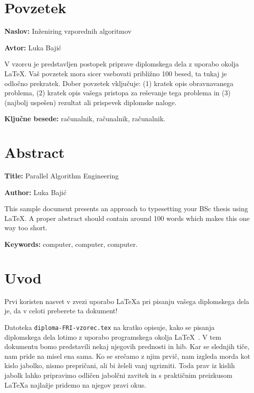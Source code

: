 \documentclass[a4paper,12pt,openright]{book}
\newcommand{\ttitle}{Inženiring vzporednih algoritmov}
\newcommand{\ttitleEn}{Parallel Algorithm Engineering}
\newcommand{\tauthor}{Luka Bajić}
\newcommand{\tkeywords}{računalnik, računalnik, računalnik}
\newcommand{\tkeywordsEn}{computer, computer, computer}
\newcommand{\clearemptydoublepage}{\newpage{\pagestyle{empty}\cleardoublepage}}
\begin{document}
\clearemptydoublepage

{}
\chapter*{Povzetek}

\noindent\textbf{Naslov:} \ttitle
\bigskip

\noindent\textbf{Avtor:} \tauthor
\bigskip

\noindent V vzorcu je predstavljen postopek priprave diplomskega dela z uporabo okolja \LaTeX. Vaš povzetek mora sicer vsebovati približno 100 besed, ta tukaj je odločno prekratek.
Dober povzetek vključuje: (1) kratek opis obravnavanega problema, (2) kratek opis vašega pristopa za reševanje tega problema in (3) (najbolj uspešen) rezultat ali prispevek diplomske naloge.

\bigskip

\noindent\textbf{Ključne besede:} \tkeywords.
\clearemptydoublepage

{}
\chapter*{Abstract}

\noindent\textbf{Title:} \ttitleEn
\bigskip

\noindent\textbf{Author:} \tauthor
\bigskip

\noindent This sample document presents an approach to typesetting your BSc thesis using \LaTeX. 
A proper abstract should contain around 100 words which makes this one way too short.
\bigskip

\noindent\textbf{Keywords:} \tkeywordsEn.
\clearemptydoublepage

\mainmatter
\setcounter{page}{1}
\pagestyle{fancy}

\chapter{Uvod}
Prvi koristen nasvet v zvezi uporabo \LaTeX{a} pri pisanju vašega diplomskega dela je, da v celoti preberete ta dokument!

Datoteka {\tt diploma-FRI-vzorec.tex} na kratko opisuje, kako se pisanja diplomskega dela lotimo z uporabo programskega okolja \LaTeX~\cite{lamport,nenajkrajsi}. 
V tem dokumentu bomo predstavili nekaj njegovih prednosti in hib. 
Kar se slednjih tiče, nam pride na misel ena sama. 
Ko se srečamo z njim prvič, nam izgleda morda kot kislo jabolko, nismo prepričani, ali bi želeli vanj ugrizniti. 
Toda prav iz kislih jabolk lahko pripravimo odličen jabolčni zavitek in s praktičnim preizkusom \LaTeX a najlažje pridemo na njegov pravi okus.
\end{document}

